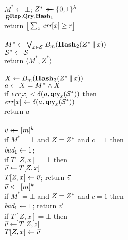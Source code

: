 \begin{figure*}
{
  \vspace{-7pt}
      \hfill {}\\[2pt]
    $M^* \gets \bot$;
    $Z^* \mathrel{\leftarrow\mkern-14mu\leftarrow} \{0,1\}^\lambda$\\
    $\mathit{B}^{\textup{\textbf{Rep}}\hspace{0.5pt},\textup{\textbf{Qry}}\hspace{0.5pt},\textup{\textbf{Hash}}\hspace{0.5pt}_1}$\\
    return $\big[\sum_x \textit{err}[x] \geq r\big]$
  \\[6pt]
  \oraclev{$\REPO(\col)$}\\[2pt]
    $M^* \gets \bigvee_{x \in \mathcal{S}} {B}_m(\textup{\textbf{Hash}}\hspace{0.5pt}_2(Z^* \, \| \, x))$\\
    $\mathcal{S}^* \gets \mathcal{S}$\\
    return $\langle M^*, Z^* \rangle$
  \\[6pt]
  \\[2pt]
    $X \gets {B}_m(\textup{\textbf{Hash}}\hspace{0.5pt}_3(Z^* \, \| \, x))$\\
    $a \gets X = M^* \wedge X$\\
    if $\textit{err}[x] < \delta(a,\mathsf{qry}_x(\mathcal{S}^*))$ then\\
          $\textit{err}[x] \gets \delta(a,\mathsf{qry}_x(\mathcal{S}^*))$\\
    return $a$
  \\[6pt]
  \\[2pt]
    $\vec{v} \mathrel{\leftarrow\mkern-14mu\leftarrow} [m]^k$\\
    if $M^*=\bot$ and $Z=Z^*$ and $c=1$ then\\
    \tab $\textit{bad}_1 \gets 1$;  \\
    if $T[Z,x] = \bot$ then\\
    \tab $\vec{v} \gets T[Z,x]$\\
    $T[Z,x] \gets \vec{v}$; return $\vec{v}$
}
{
  \vspace{-2pt}
  \\[2pt]
    $\vec{v} \mathrel{\leftarrow\mkern-14mu\leftarrow} [m]^k$\\
    if $M^*=\bot$ and $Z=Z^*$ and $c=1$ then\\
    \tab $\textit{bad}_1 \gets 1$; return $\vec{v}$\\
    if $T[Z,x] = \bot$ then\\
    \tab $\vec{v} \gets T[Z,z]$\\
    $T[Z,x] \gets \vec{v}$\\[2pt]
    }
\end{figure*}
